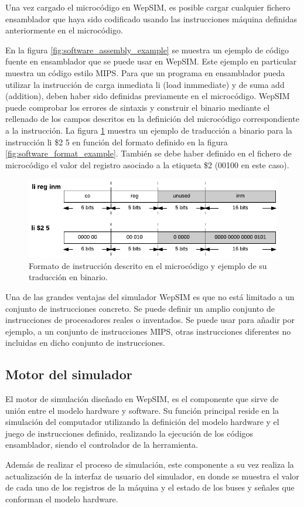 Una vez cargado el microcódigo en WepSIM, es posible cargar cualquier fichero ensamblador que haya sido codificado usando las instrucciones  máquina definidas anteriormente en el microcódigo.

En la figura \ref{fig:software_assembly_example} se muestra un ejemplo de código fuente en ensamblador que se puede usar en WepSIM. Este ejemplo en particular muestra un código estilo MIPS. Para que un programa en ensamblador pueda utilizar la instrucción de carga inmediata li (load inmmediate) y de suma add (addition), deben haber sido definidas previamente en el microcódigo. WepSIM puede comprobar los errores de sintaxis y construir el binario mediante el rellenado de los campos descritos en la definición del microcódigo correspondiente a la instrucción. La figura \ref{fig:software_assembly_traduction} muestra un ejemplo de traducción a binario para la instrucción li \$2 5 en función del formato definido en la figura \ref{fig:software_format_example}. También se debe haber definido en el fichero de microcódigo el valor del registro asociado a la etiqueta \$2 (00100 en este caso).

\begin{figure}[htbp]
 	\centering
 	\includegraphics[width=14cm]{figures/instruction_example_traduction}
 	\caption{Formato de instrucción descrito en el microcódigo y ejemplo de su traducción en binario.}
	\label{fig:software_assembly_traduction}
\end{figure}

Una de las grandes ventajas del simulador WepSIM es que no está limitado a un conjunto de instrucciones concreto. Se puede definir un amplio conjunto de instrucciones de procesadores reales o inventados. Se puede usar para añadir por ejemplo, a un conjunto de instrucciones MIPS, otras instrucciones diferentes no incluidas en dicho conjunto de instrucciones.

\subsection{Motor del simulador}

El motor de simulación diseñado en WepSIM, es el componente que sirve de unión entre el modelo hardware y software. Su función principal reside en la simulación del computador utilizando la definición del modelo hardware  y el juego de instrucciones definido, realizando la ejecución de los códigos ensamblador, siendo el controlador de la herramienta. 

Además de realizar el proceso de simulación, este componente a su vez realiza la actualización de la interfaz de usuario del simulador, en donde se muestra el valor de cada uno de los registros de la máquina y el estado de los buses y señales que conforman el modelo hardware.

